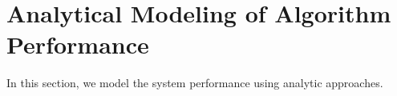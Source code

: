 \section{Analytical Modeling of Algorithm Performance}
\label{analysis}

In this section, we model the system performance using analytic approaches. 
